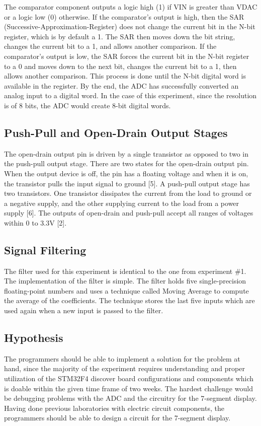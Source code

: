 \documentclass[12pt]{report}
\begin{document}
The comparator component outputs a logic high (1) if VIN is greater than VDAC or a logic low (0) otherwise. If the comparator’s output is high, then the SAR (Successive-Approximation-Register) does not change the current bit in the N-bit register, which is by default a 1. The SAR then moves down the bit string, changes the current bit to a 1, and allows another comparison. If the comparator’s output is low, the SAR forces the current bit in the N-bit register to a 0 and moves down to the next bit, changes the current bit to a 1, then allows another comparison. This process is done until the N-bit digital word is available in the register. By the end, the ADC has successfully converted an analog input to a digital word. In the case of this experiment, since the resolution is of 8 bits, the ADC would create 8-bit digital words.
\subsection{Push-Pull and Open-Drain Output Stages}
The open-drain output pin is driven by a single transistor as opposed to two in the push-pull output stage. There are two states for the open-drain output pin. When the output device is off, the pin has a floating voltage and when it is on, the transistor pulls the input signal to ground [5].
A push-pull output stage has two transistors. One transistor dissipates the current from the load to ground or a negative supply, and the other supplying current to the load from a power supply [6]. The outputs of open-drain and push-pull accept all ranges of voltages within 0 to 3.3V [2]. 
\subsection{Signal Filtering}
The filter used for this experiment is identical to the one from experiment \#1. The implementation of the filter is simple. The filter holds five single-precision floating-point numbers and uses a technique called Moving Average to compute the average of the coefficients. The technique stores the last five inputs which are used again when a new input is passed to the filter.
\subsection{Hypothesis}
The programmers should be able to implement a solution for the problem at hand, since the majority of the experiment requires understanding and proper utilization of the STM32F4 discover board configurations and components which is doable within the given time frame of two weeks. The hardest challenge would be debugging problems with the ADC and the circuitry for the 7-segment display. Having done previous laboratories with electric circuit components, the programmers should be able to design a circuit for the 7-segment display.
\end{document}
